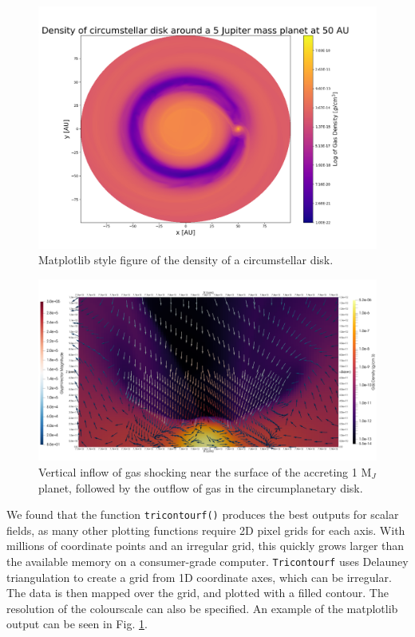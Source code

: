 \documentclass[preprint2]{aastex62}
\begin{document}
\begin{figure}
	\includegraphics[width=\linewidth]{figures/Presentation/mpl.png}
	\caption{\label{fig:mpl}Matplotlib style figure of the density of a circumstellar disk.}
\end{figure}  

\begin{figure}[htb!]
	\centering
	\includegraphics[width=1.0\linewidth]{figures/Presentation/OutFlowCross.png}
	\caption{\label{fig:vel} Vertical inflow of gas shocking near the surface of the accreting 1 M$_{J}$ planet, followed by the outflow of gas in the circumplanetary disk.}
\end{figure}

We found that the function \verb|tricontourf()| produces the best outputs for scalar fields, as many other plotting functions require 2D pixel grids for each axis. 
With millions of coordinate points and an irregular grid, this quickly grows larger than the available memory on a consumer-grade computer.
\verb|Tricontourf| uses Delauney triangulation to create a grid from 1D coordinate axes, which can be irregular. The data is then mapped over the grid, and plotted with a filled contour. The resolution of the colourscale can also be specified. 
An example of the matplotlib output can be seen in Fig. \ref{fig:mpl}.
\end{document}
